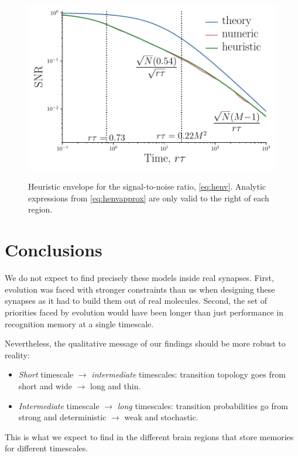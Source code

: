 \documentclass[12pt]{article}
\begin{document}
\begin{figure}[tb]
  \centering
  \includegraphics[width=0.8\linewidth]{LenvHeuristic.pdf}\\
  \caption[Heuristic envelope for the signal-to-noise ratio]
  {Heuristic envelope  for the signal-to-noise ratio, \cref{eq:henv}.
  Analytic expressions from \cref{eq:henvapprox} are only valid to the right of each region.}\label{fig:heuristicenv}
\end{figure}



\section{Conclusions}\label{sec:conclusions}


We do not expect to find precisely these models inside real synapses.
First, evolution was faced with stronger constraints than us when designing these synapses as it had to build them out of real molecules.
Second, the set of priorities faced by evolution would have been longer than just performance in recognition memory at a single timescale.

Nevertheless, the qualitative message of our findings should be more robust to reality:
%
\begin{itemize}
  \item \emph{Short} timescale $\to$ \emph{intermediate} timescales: transition topology goes from \\ short and wide $\to$ long and thin.
  \item \emph{Intermediate} timescale $\to$ \emph{long} timescales: transition probabilities go from \\ strong and deterministic $\to$ weak and stochastic.
\end{itemize}
%
This is what we expect to find in the different brain regions that store memories for different timescales.
\end{document}
